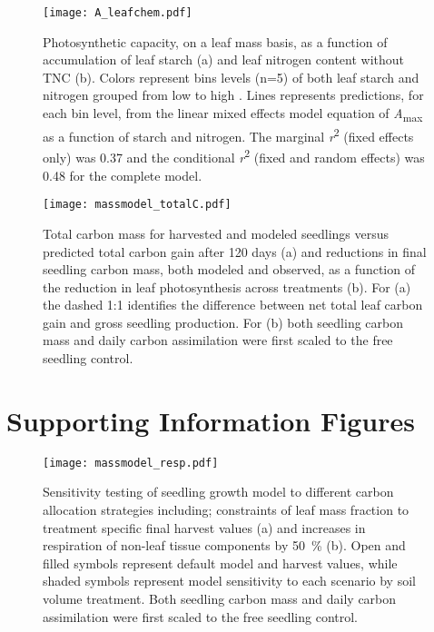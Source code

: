 \documentclass[a4paper]{article}\usepackage[]{graphicx}\usepackage[]{color}
\begin{document}
\begin{figure}[h!]
    \centering
    \texttt{[image: A\_leafchem.pdf]}
    \caption{Photosynthetic capacity, on a leaf mass basis, as a function of accumulation of leaf starch (a) and leaf nitrogen content without TNC (b).  Colors represent bins levels (n=5) of both leaf starch and nitrogen grouped from low to high .  Lines represents predictions, for each bin level, from the linear mixed effects model equation of \textit{A}\textsubscript{max} as a function of starch and nitrogen. The marginal \textit{r}\textsuperscript{2} (fixed effects only) was 0.37 and the conditional \textit{r}\textsuperscript{2} (fixed and random effects) was 0.48 for the complete model.}
    \label{fig:figure5}
\end{figure}

\begin{figure}[h!]
    \centering
    \texttt{[image: massmodel\_totalC.pdf]}
    \caption{Total carbon mass for harvested and modeled seedlings versus predicted total carbon gain after 120 days (a) and  reductions in final seedling carbon mass, both modeled and observed, as a function of the reduction in leaf photosynthesis across treatments (b). For (a) the dashed 1:1 identifies the difference between net total leaf carbon gain and gross seedling production. For (b) both seedling carbon mass and daily carbon assimilation were first scaled to the free seedling control.}
    \label{fig:figure6}
\end{figure}

\clearpage
\section{Supporting Information Figures}

\renewcommand\thefigure{S\arabic{figure}}    
\setcounter{figure}{0}   


\begin{figure}[h!]
    \centering
    \texttt{[image: massmodel\_resp.pdf]}
    \caption{Sensitivity testing of seedling growth model to different carbon allocation strategies including; constraints of leaf mass fraction to treatment specific final harvest values (a) and increases in respiration of non-leaf tissue components by 50~\% (b).  Open and filled symbols represent default model and harvest values, while shaded symbols represent model sensitivity to each scenario by soil volume treatment. Both seedling carbon mass and daily carbon assimilation were first scaled to the free seedling control.}
    \label{fig:figureSI1}
\end{figure}
\end{document}

